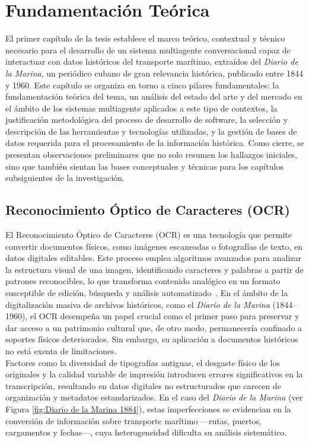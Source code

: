 \chapter{Fundamentación Teórica}
\label{chap:chapter1}

El primer capítulo de la tesis establece el marco teórico, contextual y técnico necesario para el desarrollo de un sistema multiagente conversacional capaz de interactuar con datos históricos del transporte marítimo, extraídos del \textit{Diario de la Marina}, un periódico cubano de gran relevancia histórica, publicado entre 1844 y 1960. Este capítulo se organiza en torno a cinco pilares fundamentales: la fundamentación teórica del tema, un análisis del estado del arte y del mercado en el ámbito de los sistemas multiagente aplicados a este tipo de contextos, la justificación metodológica del proceso de desarrollo de software, la selección y descripción de las herramientas y tecnologías utilizadas, y la gestión de bases de datos requerida para el procesamiento de la información histórica. Como cierre, se presentan observaciones preliminares que no solo resumen los hallazgos iniciales, sino que también sientan las bases conceptuales y técnicas para los capítulos subsiguientes de la investigación.

\section{Reconocimiento Óptico de Caracteres (OCR)}\label{seq_1}

El Reconocimiento Óptico de Caracteres (OCR) es una tecnología que permite convertir documentos físicos, como imágenes escaneadas o fotografías de texto, en datos digitales editables. Este proceso emplea algoritmos avanzados para analizar la estructura visual de una imagen, identificando caracteres y palabras a partir de patrones reconocibles, lo que transforma contenido analógico en un formato susceptible de edición, búsqueda y análisis automatizado~\cite{piryani2025multilocraqa}. En el ámbito de la digitalización masiva de archivos históricos, como el \textit{Diario de la Marina} (1844–1960), el OCR desempeña un papel crucial como el primer paso para preservar y dar acceso a un patrimonio cultural que, de otro modo, permanecería confinado a soportes físicos deteriorados.
Sin embargo, su aplicación a documentos históricos no está exenta de limitaciones.\\ 
Factores como la diversidad de tipografías antiguas, el desgaste físico de los originales y la calidad variable de impresión introducen errores significativos en la transcripción, resultando en datos digitales no estructurados que carecen de organización y metadatos estandarizados. En el caso del \textit{Diario de la Marina} (ver Figura \ref{fig:Diario de la Marina 1884}), estas imperfecciones se evidencian en la conversión de información sobre transporte marítimo —rutas, puertos, cargamentos y fechas—, cuya heterogeneidad dificulta su análisis sistemático.

